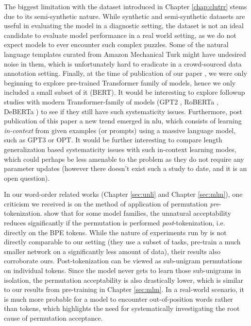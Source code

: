 \documentclass[letterpaper, 12pt]{report}
\begin{document}
The biggest limitation with the dataset introduced in Chapter \autoref{chap:clutrr} stems due to its semi-synthetic nature. While synthetic and semi-synthetic datasets are useful in evaluating the model in a diagnostic setting, the dataset is not an ideal candidate to evaluate model performance in a real world setting, as we do not expect models to ever encounter such complex puzzles. Some of the natural language templates curated from Amazon Mechanical Turk might have undesired noise in them, which is unfortunately hard to eradicate in a crowd-sourced data annotation setting. Finally, at the time of publication of our paper \citep{sinha-etal-2019-clutrr}, we were only beginning to explore pre-trained Transformer family of models, hence we only included a small subset of it (BERT). It would be interesting to explore followup studies with modern Transformer-family of models (GPT2 \citep{Radford2019:GPT2}, RoBERTa \citep{liu-et-al-2019-roberta}, DeBERTa \citep{he2020deberta}) to see if they still have such systematicity issues. Furthermore, post publication of this paper a new trend emerged in \acrshort{nlu}, which consists of learning \textit{in-context} from given examples (or prompts) using a massive language model, such as GPT3 or OPT. It would be further interesting to compare length generalization based systematicity issues with such in-context learning modes, which could perhaps be less amenable to the problem as they do not require any parameter updates (however there doesn't exist such a study to date, and it is an open question).

In our word-order related works (Chapter \autoref{sec:unli} and Chapter \autoref{sec:mlm}), one criticism we received is on the method of application of permutation \textit{pre}-tokenization. \cite{ravishankar2022word} show that for some model families, the unnatural acceptability reduces significantly if the permutation is performed \textit{post}-tokenization, i.e. directly on the BPE tokens. While the nature of experiments run by \cite{ravishankar2022word} is not directly comparable to our setting (they use a subset of tasks, pre-train a much smaller network on a significantly less amount of data), their results also corroborate ours. Post-tokenization can be viewed as sub-unigram permutations on individual tokens. Since the model never gets to learn those sub-unigrams in isolation, the permutation acceptability is also drastically lower, which is similar to our results from pre-training in Chapter \autoref{sec:mlm}. In a real-world scenario, it is much more probable for a model to encounter out-of-position words rather than tokens, which highlights the need for systematically investigating the root cause of permutation acceptance.
\end{document}
